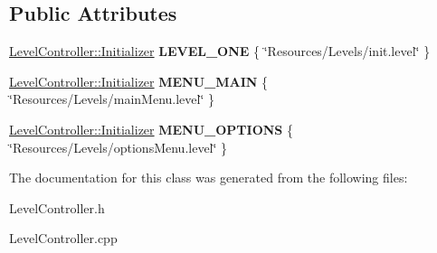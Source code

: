 \subsection*{Public Attributes}
\begin{DoxyCompactItemize}
\item 
\hypertarget{class_level_controller_aed3a20ba260b3562516561bc065fd3de}{\hyperlink{class_level_controller_1_1_initializer}{Level\-Controller\-::\-Initializer} {\bfseries L\-E\-V\-E\-L\-\_\-\-O\-N\-E} \{ \char`\"{}Resources/Levels/init.\-level\char`\"{} \}}\label{class_level_controller_aed3a20ba260b3562516561bc065fd3de}

\item 
\hypertarget{class_level_controller_ad4835322127c6b5d093be8f8ea1735bd}{\hyperlink{class_level_controller_1_1_initializer}{Level\-Controller\-::\-Initializer} {\bfseries M\-E\-N\-U\-\_\-\-M\-A\-I\-N} \{ \char`\"{}Resources/Levels/main\-Menu.\-level\char`\"{} \}}\label{class_level_controller_ad4835322127c6b5d093be8f8ea1735bd}

\item 
\hypertarget{class_level_controller_a062b3091693fbfeb9140431659899ad7}{\hyperlink{class_level_controller_1_1_initializer}{Level\-Controller\-::\-Initializer} {\bfseries M\-E\-N\-U\-\_\-\-O\-P\-T\-I\-O\-N\-S} \{ \char`\"{}Resources/Levels/options\-Menu.\-level\char`\"{} \}}\label{class_level_controller_a062b3091693fbfeb9140431659899ad7}

\end{DoxyCompactItemize}


The documentation for this class was generated from the following files\-:\begin{DoxyCompactItemize}
\item 
Level\-Controller.\-h\item 
Level\-Controller.\-cpp\end{DoxyCompactItemize}
